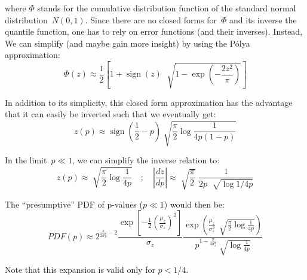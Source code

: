 \documentclass{article}
\DeclareMathOperator{\sign}{sign}
\begin{document}
\noindent where $\Phi$ stands for the cumulative distribution function of the standard normal distribution~$N(0, 1)$.  Since there are no closed forms for~$\Phi$ and its inverse the quantile function, one has to rely on error functions (and their inverses).  Instead, We can simplify (and maybe gain more insight) by using the P\'{o}lya approximation:
\begin{equation}
\Phi(z) \approx \frac{1}{2} \left[ 1 + \sign(z) \, \, \sqrt[]{1 - \exp \left( - \frac{2 z^2}{\pi} \right)} \right]
\end{equation}

\noindent In addition to its simplicity, this closed form approximation has the advantage that it can easily be inverted such that we eventually get:
\begin{equation}
z(p) \approx \sign \left( \frac{1}{2} - p \right) \sqrt[]{\frac{\pi}{2} \log \frac{1}{4 p (1 - p) }}
\end{equation}

\noindent In the limit~$p \ll 1$, we can simplify the inverse relation to:
\begin{equation}
z(p) \approx \sqrt[]{\frac{\pi}{2} \log \frac{1}{4p}} \quad ; \quad \left| \frac{dz}{dp} \right| \approx \sqrt[]{\frac{\pi}{2}} \,\, \frac{1}{2 p \, \, \sqrt[]{\log 1 / 4p}}
\end{equation}

\noindent The ``presumptive'' PDF of p-values ($p \ll 1$) would then be:
\begin{equation}
PDF(p) \approx 2^{\frac{\pi}{2\sigma_z^2} - 2} \frac{\exp \left[ - \frac{1}{2} \left( \frac{\mu_z}{\sigma_z} \right)^2 \right] }{\sigma_z}  \frac{\exp \left( \frac{\mu_z}{\sigma_z^2} \, \sqrt[]{\frac{\pi}{2} \log \frac{1}{4p}} \right)  }{p^{1 - \frac{\pi}{4\sigma_z^2}} \sqrt[]{\log \frac{1}{4p}}  }
\end{equation}

\noindent Note that this expansion is valid only for $p<1/4$.
\end{document}
